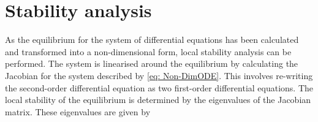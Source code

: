 \section{Stability analysis}







As the equilibrium for the system of differential equations has been calculated and transformed into a non-dimensional form, local stability analysis can be performed. The system is linearised around the equilibrium by calculating the Jacobian for the system described by \cref{eq: Non-DimODE}. This involves re-writing the second-order differential equation as two first-order differential equations. The local stability of the equilibrium is determined by the eigenvalues of the Jacobian matrix. These eigenvalues are given by

